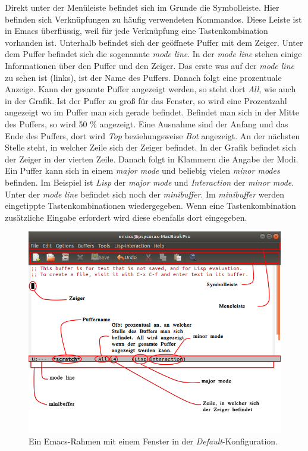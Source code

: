 Direkt unter der Menüleiste befindet sich im Grunde die
Symbolleiste. Hier befinden sich Verknüpfungen zu häufig verwendeten
Kommandos. Diese Leiste ist in Emacs überflüssig, weil für jede
Verknüpfung eine Tastenkombination vorhanden ist. Unterhalb befindet
sich der geöffnete Puffer mit dem Zeiger. Unter dem Puffer befindet
sich die sogenannte {\glqq}\textit{mode line}{\grqq}. In der
\textit{mode line} stehen einige Informationen über den Puffer und den
Zeiger. Das erste was auf der \textit{mode line} zu sehen ist (links),
ist der Name des Puffers. Danach folgt eine prozentuale Anzeige. Kann
der gesamte Puffer angezeigt werden, so steht dort
{\glqq}\textit{All}{\grqq}, wie auch in der Grafik. Ist der Puffer zu
groß für das Fenster, so wird eine Prozentzahl angezeigt wo im Puffer
man sich gerade befindet. Befindet man sich in der Mitte des Puffers,
so wird 50 \% angezeigt. Eine Ausnahme sind der Anfang und das Ende
des Puffers, dort wird {\glqq}\textit{Top}{\grqq} beziehungsweise
{\glqq}\textit{Bot}{\grqq} angezeigt. An der nächsten Stelle steht, in
welcher Zeile sich der Zeiger befindet. In der Grafik befindet sich
der Zeiger in der vierten Zeile. Danach folgt in Klammern die Angabe
der Modi. Ein Puffer kann sich in einem \textit{major mode} und
beliebig vielen \textit{minor modes} befinden. Im Beispiel ist
{\glqq}\textit{Lisp}{\grqq} der \textit{major mode} und
{\glqq}\textit{Interaction}{\grqq} der \textit{minor mode}. Unter der
\textit{mode line} befindet sich noch der \textit{minibuffer}. Im
\textit{minibuffer} werden eingetippte Tastenkombinationen
wiedergegeben. Wenn eine Tastenkombination zusätzliche Eingabe
erfordert wird diese ebenfalls dort eingegeben.\\

\begin{figure}[h]
  \centering
  \includegraphics[width=.95\textwidth]{./images/Grundlagen/Emacsscreen.png}
  \caption{\label{fig:Emacsscr} Ein Emacs-Rahmen mit einem Fenster in
    der \textit{Default}-Konfiguration.}
\end{figure}

